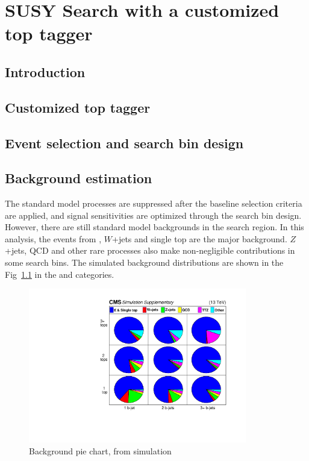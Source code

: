 \chapter{SUSY Search with a customized top tagger}

\clearpage
\section{Introduction}
\label{sec:c4intro}


\clearpage
\section{Customized top tagger}
\label{sec:c4tt}


\clearpage
\section{Event selection and search bin design}
\label{sec:c4evssbd}


\clearpage
\section{Background estimation}

The standard model processes are suppressed after the baseline selection criteria are applied, and signal sensitivities are optimized through the search bin design. However, there are still standard model backgrounds in the search region. In this analysis, the events from \ttbar, $W$+jets and single top are the major background. $Z$+jets, QCD and other rare processes also make non-negligible contributions in some search bins. The simulated background distributions are shown in the Fig~\ref{fig:c4bgmcpie} in the \ntops and \nbjets categories.

\begin{figure}[htbp]
 \begin{center}
  \includegraphics[width=0.85\textwidth]{figures/c4/c4_bg_mcpie.pdf}
 \end{center}
 \caption{Background pie chart, from simulation}
 \label{fig:c4bgmcpie}
\end{figure}

